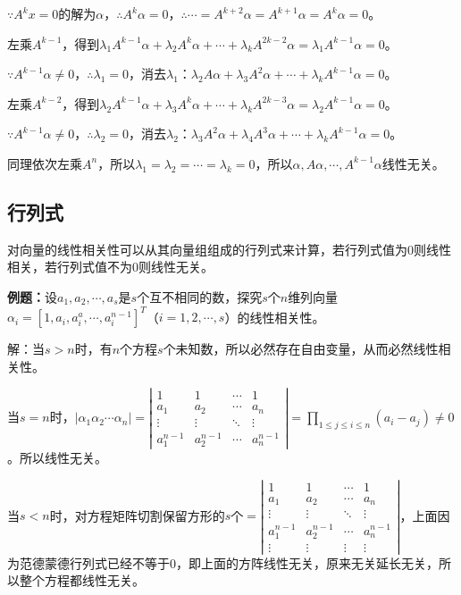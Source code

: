 \documentclass[UTF8, 12pt]{ctexart}
\begin{document}
$\because A^kx=0$的解为$\alpha$，$\therefore A^k\alpha=0$，$\therefore\cdots=A^{k+2}\alpha=A^{k+1}\alpha=A^k\alpha=0$。

左乘$A^{k-1}$，得到$\lambda_1A^{k-1}\alpha+\lambda_2A^k\alpha+\cdots+\lambda_kA^{2k-2}\alpha=\lambda_1A^{k-1}\alpha=0$。

$\because A^{k-1}\alpha\neq0$，$\therefore\lambda_1=0$，消去$\lambda_1$：$\lambda_2A\alpha+\lambda_3A^2\alpha+\cdots+\lambda_kA^{k-1}\alpha=0$。

左乘$A^{k-2}$，得到$\lambda_2A^{k-1}\alpha+\lambda_3A^k\alpha+\cdots+\lambda_kA^{2k-3}\alpha=\lambda_2A^{k-1}\alpha=0$。

$\because A^{k-1}\alpha\neq0$，$\therefore\lambda_2=0$，消去$\lambda_2$：$\lambda_3A^2\alpha+\lambda_4A^3\alpha+\cdots+\lambda_kA^{k-1}\alpha=0$。

同理依次左乘$A^n$，所以$\lambda_1=\lambda_2=\cdots=\lambda_k=0$，所以$\alpha,A\alpha,\cdots,A^{k-1}\alpha$线性无关。

\subsection{行列式}

对向量的线性相关性可以从其向量组组成的行列式来计算，若行列式值为0则线性相关，若行列式值不为0则线性无关。

\textbf{例题：}设$a_1,a_2,\cdots,a_s$是$s$个互不相同的数，探究$s$个$n$维列向量$\alpha_i=[1,a_i,a_i^a,\cdots,a_i^{n-1}]^T$（$i=1,2,\cdots,s$）的线性相关性。

解：当$s>n$时，有$n$个方程$s$个未知数，所以必然存在自由变量，从而必然线性相关性。

当$s=n$时，$\vert\alpha_1 \alpha_2 \cdots \alpha_n\vert=\left|\begin{array}{cccc}
    1 & 1 & \cdots & 1 \\
    a_1 & a_2 & \cdots & a_n \\
    \vdots & \vdots & \ddots & \vdots \\
    a_1^{n-1} & a_2^{n-1} & \cdots & a_n^{n-1}
\end{array}\right|=\prod\limits_{1\leqslant j\leqslant i\leqslant n}(a_i-a_j)\neq0$。所以线性无关。

当$s<n$时，对方程矩阵切割保留方形的$s$个$=\left|\begin{array}{cccc}
    1 & 1 & \cdots & 1 \\
    a_1 & a_2 & \cdots & a_n \\
    \vdots & \vdots & \ddots & \vdots \\
    a_1^{n-1} & a_2^{n-1} & \cdots & a_n^{n-1} \\
    \vdots & \vdots & \vdots & \vdots
\end{array}\right|$，上面因为范德蒙德行列式已经不等于0，即上面的方阵线性无关，原来无关延长无关，所以整个方程都线性无关。
\end{document}
